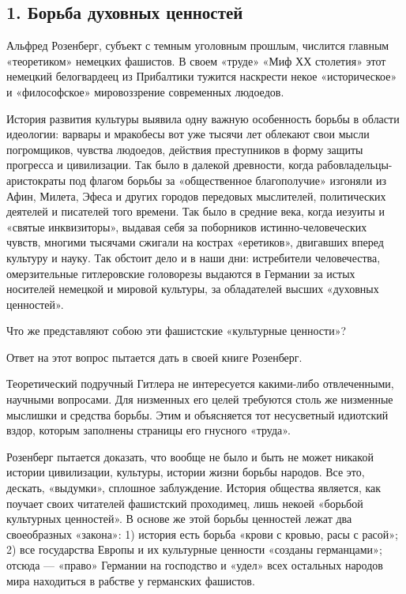 \documentclass[12pt, a4paper, openany]{book}
\begin{document}
	\subsection*{\center \textbf{1. Борьба духовных ценностей}}


Альфред Розенберг, субъект с темным уголовным прошлым, числится главным «теоретиком» немецких фашистов. В своем «труде» «Миф ХХ столетия» этот немецкий белогвардеец из Прибалтики тужится наскрести некое «историческое» и «философское» мировоззрение современных людоедов.

История развития культуры выявила одну важную особенность борьбы в области идеологии: варвары и мракобесы вот уже тысячи лет облекают свои мысли погромщиков, чувства людоедов, действия преступников в форму защиты прогресса и цивилизации. Так было в далекой древности, когда рабовладельцы-аристократы под флагом борьбы за «общественное благополучие» изгоняли из Афин, Милета, Эфеса и других городов передовых мыслителей, политических деятелей и писателей того времени. Так было в средние века, когда иезуиты и «святые инквизиторы», выдавая себя за поборников истинно-человеческих чувств, многими тысячами сжигали на кострах «еретиков», двигавших вперед культуру и науку. Так обстоит дело и в наши дни: истребители человечества, омерзительные гитлеровские головорезы выдаются в Германии за истых носителей немецкой и мировой культуры, за обладателей высших «духовных ценностей».

Что же представляют собою эти фашистские «культурные ценности»?

Ответ на этот вопрос пытается дать в своей книге Розенберг.

Теоретический подручный Гитлера не интересуется какими-либо отвлеченными, научными вопросами. Для низменных его целей требуются столь же низменные мыслишки и средства борьбы. Этим и объясняется тот несусветный идиотский вздор, которым заполнены страницы его гнусного «труда».

Розенберг пытается доказать, что вообще не было и быть не может никакой истории цивилизации, культуры, истории жизни борьбы народов. Все это, дескать, «выдумки», сплошное заблуждение. История общества является, как поучает своих читателей фашистский проходимец, лишь некоей «борьбой культурных ценностей». В основе же этой борьбы ценностей лежат два своеобразных «закона»: 1) история есть борьба «крови с кровью, расы с расой»; 2) все государства Европы и их культурные ценности «созданы германцами»; отсюда — «право» Германии на господство и «удел» всех остальных народов мира находиться в рабстве у германских фашистов.
\end{document}
